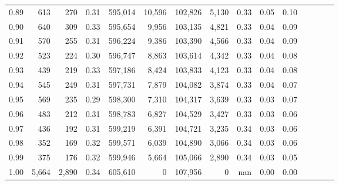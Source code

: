 \begin{tabular}{rrrcrrrrrrrrrrr}
0.89 &     613 &    270 &                                       0.31 &  595,014 &   10,596 &  102,826 &    5,130 &  0.33 &  0.05 &                         0.10 \\
0.90 &     640 &    309 &                                       0.33 &  595,654 &    9,956 &  103,135 &    4,821 &  0.33 &  0.04 &                         0.09 \\
0.91 &     570 &    255 &                                       0.31 &  596,224 &    9,386 &  103,390 &    4,566 &  0.33 &  0.04 &                         0.09 \\
0.92 &     523 &    224 &                                       0.30 &  596,747 &    8,863 &  103,614 &    4,342 &  0.33 &  0.04 &                         0.08 \\
0.93 &     439 &    219 &                                       0.33 &  597,186 &    8,424 &  103,833 &    4,123 &  0.33 &  0.04 &                         0.08 \\
0.94 &     545 &    249 &                                       0.31 &  597,731 &    7,879 &  104,082 &    3,874 &  0.33 &  0.04 &                         0.07 \\
0.95 &     569 &    235 &                                       0.29 &  598,300 &    7,310 &  104,317 &    3,639 &  0.33 &  0.03 &                         0.07 \\
0.96 &     483 &    212 &                                       0.31 &  598,783 &    6,827 &  104,529 &    3,427 &  0.33 &  0.03 &                         0.06 \\
0.97 &     436 &    192 &                                       0.31 &  599,219 &    6,391 &  104,721 &    3,235 &  0.34 &  0.03 &                         0.06 \\
0.98 &     352 &    169 &                                       0.32 &  599,571 &    6,039 &  104,890 &    3,066 &  0.34 &  0.03 &                         0.06 \\
0.99 &     375 &    176 &                                       0.32 &  599,946 &    5,664 &  105,066 &    2,890 &  0.34 &  0.03 &                         0.05 \\
1.00 &   5,664 &  2,890 &                                       0.34 &  605,610 &        0 &  107,956 &        0 &   nan &  0.00 &                         0.00 \\
\bottomrule
\end{tabular}
